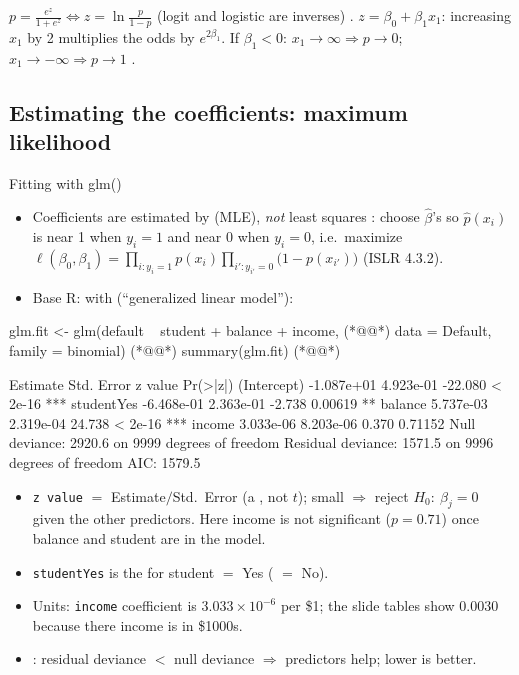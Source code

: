 \begin{keybox}
$p=\frac{e^z}{1+e^z}\iff z=\ln\frac{p}{1-p}$ (logit and logistic are inverses) .\quad
$z=\beta_0+\beta_1x_1$: increasing $x_1$ by 2 multiplies the odds by $e^{2\beta_1}$.
If $\beta_1<0$: $x_1\to\infty\Rightarrow p\to0$;\; $x_1\to-\infty\Rightarrow p\to1$ .
\end{keybox}

\subsection{Estimating the coefficients: maximum likelihood}

\begin{topic}{Fitting with glm()}
\begin{itemize}
\item Coefficients are estimated by  (MLE), \emph{not} least squares :
  choose $\hat\beta$'s so $\hat p(x_i)$ is near 1 when $y_i=1$ and near 0 when $y_i=0$, i.e.\ maximize
  $\ell(\beta_0,\beta_1)=\prod_{i:y_i=1}p(x_i)\prod_{i':y_{i'}=0}\bigl(1-p(x_{i'})\bigr)$ (ISLR 4.3.2).
\item Base R:  with  (``generalized linear model''):
\end{itemize}
\begin{rcode}
glm.fit <- glm(default ~ student + balance + income,      (*@@*)
               data = Default, family = binomial)        (*@@*)
summary(glm.fit)                                          (*@@*)
\end{rcode}
\begin{routput}
              Estimate Std. Error z value Pr(>|z|)
(Intercept) -1.087e+01  4.923e-01 -22.080  < 2e-16 ***
studentYes  -6.468e-01  2.363e-01  -2.738  0.00619 **
balance      5.737e-03  2.319e-04  24.738  < 2e-16 ***
income       3.033e-06  8.203e-06   0.370  0.71152
    Null deviance: 2920.6  on 9999  degrees of freedom
Residual deviance: 1571.5  on 9996  degrees of freedom
AIC: 1579.5
\end{routput}
\begin{itemize}
\item \texttt{z value} $=$ Estimate$/$Std.\ Error (a , not $t$); small 
  $\Rightarrow$ reject $H_0{:}\ \beta_j=0$ given the other predictors. Here income is not significant
  ($p=0.71$) once balance and student are in the model.
\item \texttt{studentYes} is the  for student $=$ Yes ( $=$ No).
\item Units: \texttt{income} coefficient is $3.033\times10^{-6}$ per \$1; the slide tables show
  $0.0030$ because there income is in \$1000s.
\item {}: residual deviance $<$ null deviance $\Rightarrow$ predictors help; lower  is better.
\end{itemize}
\end{topic}

